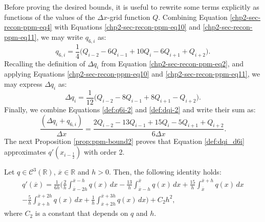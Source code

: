 Before proving the desired bounds, it is useful to rewrite some terms
explicitly as functions of the values of the $\Delta x$-grid function $Q$.
Combining Equation \eqref{chp2-sec-recon-ppm-eq4} with Equations
\eqref{chp2-sec-recon-ppm-eq10} and \eqref{chp2-sec-recon-ppm-eq11}, 
we may write $q_{6,i}$ as:
\begin{equation}
	\label{def:q6i-2}
	q_{6,i} = \frac{1}{4} \bigg( Q_{i-2} - 6Q_{i-1} + 10Q_{i} -6Q_{i+1}  + Q_{i+2} \bigg).
\end{equation}
Recalling the definition of $\Delta q_i$ from Equation \eqref{chp2-sec-recon-ppm-eq2},
and applying Equations \eqref{chp2-sec-recon-ppm-eq10} and \eqref{chp2-sec-recon-ppm-eq11}, 
we may express $\Delta q_i$ as:
\begin{equation}
	\label{def:dqi-2}
	\Delta q_i = \frac{1}{12} \bigg(Q_{i-2} -8Q_{i-1} + 8Q_{i+1} -Q_{i+2} \bigg).
\end{equation}
Finally, we combine Equations \eqref{def:q6i-2} and \eqref{def:dqi-2} and write their sum as:
\begin{equation} 
	\label{def:dqi_d6i}
	\frac{(\Delta q_i + q_{6, i})}{\Delta x} = 
	\frac{2Q_{i-2}-13Q_{i-1} +15Q_i -5Q_{i+1} + Q_{i+2}}{6\Delta x}.
\end{equation}
The next Proposition \ref{prop:ppm-bound2} proves that Equation \eqref{def:dqi_d6i}
approximates $q'(x_{i-\frac{1}{2}})$ with order 2.
\begin{prop}
	\label{prop:ppm-bound2}
	Let $q \in \mathcal{C}^{3}(\mathbb{R})$, $\overline{x}\in \mathbb{R}$ and $h>0$.
	Then, the following identity holds:
	\begin{equation}
		\begin{split}
			\label{prop:ppm-bound2-eq1}
			q'(\overline{x} ) = \frac{1}{6h}
			\bigg( \frac{2}{h} \int_{\overline{x}-2h}^{\overline{x}-h} q(x) \,dx 
			-\frac{13}{h}\int_{\overline{x}-h}^{\overline{x}} q(x) \,dx   
			+\frac{15}{h}\int_{\overline{x}}^{\overline{x}+h} q(x) \,dx  \\ 
			-\frac{5}{h} \int_{\overline{x}+h}^{\overline{x}+2h} q(x) \,dx   
			+\frac{1}{h} \int_{\overline{x}+2h}^{\overline{x}+3h} q(x) \,dx   
			\bigg) + C_2h^2,
		\end{split}
	\end{equation}
	where $C_2$ is a constant that depends on $q$ and $h$.
\end{prop}

